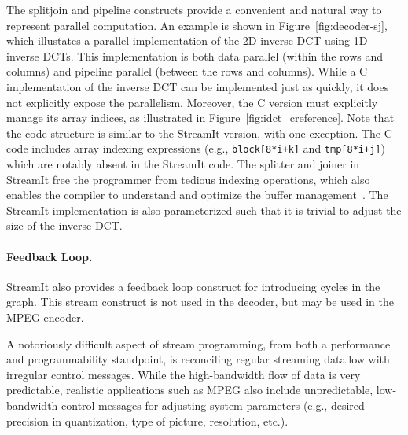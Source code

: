 The splitjoin and pipeline constructs provide a convenient and natural
way to represent parallel computation. An example is shown in
Figure~\ref{fig:decoder-sj}, which illustates a parallel
implementation of the 2D inverse DCT using 1D inverse DCTs. This
implementation is both data parallel (within the rows and columns) and
pipeline parallel (between the rows and columns). While a C
implementation of the inverse DCT can be implemented just as quickly,
it does not explicitly expose the parallelism. Moreover, the C version
must explicitly manage its array indices, as illustrated in
Figure~\ref{fig:idct_creference}. Note that the code structure is
similar to the StreamIt version, with one exception. The C code
includes array indexing expressions (e.g., \texttt{block[8*i+k]} and
\texttt{tmp[8*i+j]}) which are notably absent in the StreamIt
code. The splitter and joiner in StreamIt free the programmer from
tedious indexing operations, which also enables the compiler to
understand and optimize the buffer management~\cite{sermulins05lctes}.
The StreamIt implementation is also parameterized such that it is
trivial to adjust the size of the inverse DCT.


\paragraph{Feedback Loop.}
StreamIt also provides a feedback loop construct for introducing
cycles in the graph. This stream construct is not used in the decoder,
but may be used in the MPEG encoder.

\label{sec:messaging}
A notoriously difficult aspect of stream programming, from both a
performance and programmability standpoint, is reconciling regular
streaming dataflow with irregular control messages.  While the
high-bandwidth flow of data is very predictable, realistic
applications such as MPEG also include unpredictable, low-bandwidth
control messages for adjusting system parameters (e.g., desired
precision in quantization, type of picture, resolution, etc.).

